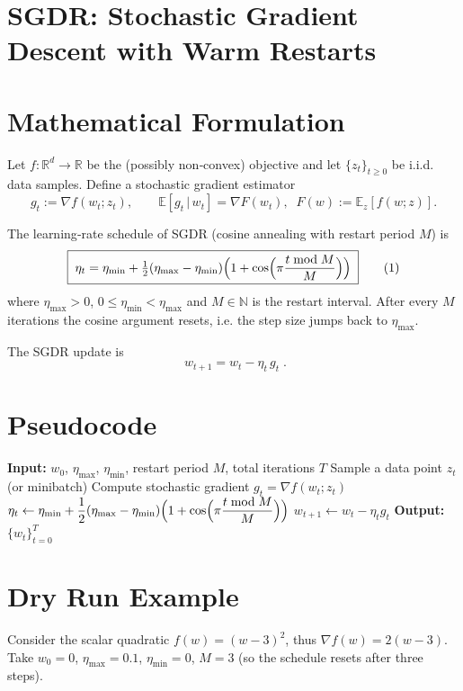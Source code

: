 \documentclass{article}
\newcommand{\E}{\mathbb{E}}
\newcommand{\R}{\mathbb{R}}
\begin{document}
\section*{SGDR: Stochastic Gradient Descent with Warm Restarts}

\section*{Mathematical Formulation}
Let $f:\R^{d}\rightarrow\R$ be the (possibly non‑convex) objective and let $\{z_t\}_{t\ge 0}$ be i.i.d. data samples.
Define a stochastic gradient estimator 
\[
g_t:=\nabla f(w_t;z_t),\qquad 
\E[g_t\,|\,w_t]=\nabla F(w_t),\;\; F(w):=\E_{z}[f(w;z)] .
\]

The learning‑rate schedule of SGDR (cosine annealing with restart period $M$) is
\[
\boxed{\;
\eta_t = \eta_{\min}+ \tfrac12(\eta_{\max}-\eta_{\min})\Bigl(1+\cos\Bigl(\pi \frac{t\bmod M}{M}\Bigr)\Bigr)
\;}
\tag{1}
\]
where $\eta_{\max}>0$, $0\le \eta_{\min}<\eta_{\max}$ and $M\in\mathbb{N}$ is the restart interval.  
After every $M$ iterations the cosine argument resets, i.e. the step size jumps back to $\eta_{\max}$.

The SGDR update is
\[
\boxed{\; w_{t+1}=w_t-\eta_t\,g_t \;}. \tag{2}
\]

\section*{Pseudocode}
\begin{algorithm}[H]
\caption{SGDR}
\begin{algorithmic}[1]
\STATE \textbf{Input:} $w_0$, $\eta_{\max}$, $\eta_{\min}$, restart period $M$, total iterations $T$  
    \STATE Sample a data point $z_t$ (or minibatch)  
    \STATE Compute stochastic gradient $g_t=\nabla f(w_t;z_t)$  
    \STATE $\displaystyle \eta_t \gets \eta_{\min}+ \frac12(\eta_{\max}-\eta_{\min})\Bigl(1+\cos\Bigl(\pi\frac{t\bmod M}{M}\Bigr)\Bigr)$ \hfill{}
    \STATE $w_{t+1}\gets w_t-\eta_t g_t$  
\ENDFOR
\STATE \textbf{Output:} $\{w_t\}_{t=0}^{T}$
\end{algorithmic}
\end{algorithm}

\section*{Dry Run Example}
Consider the scalar quadratic $f(w)=(w-3)^2$, thus $\nabla f(w)=2(w-3)$.  
Take $w_0=0$, $\eta_{\max}=0.1$, $\eta_{\min}=0$, $M=3$ (so the schedule resets after three steps).
\end{document}
